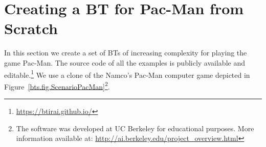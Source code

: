 %
%




\newpage	
\section{Creating a BT for Pac-Man from Scratch}
\label{sec:pacman}
In this section we create a set of BTs of increasing complexity for playing the game Pac-Man.
The source code of all the examples is publicly available and editable.\footnote{\url{https://btirai.github.io/}}
We use  a clone of the Namco's Pac-Man computer game depicted in Figure~\ref{bts.fig.ScenarioPacMan}\footnote{The software was developed at UC Berkeley for educational purposes. More information available at: \url{http://ai.berkeley.edu/project_overview.html}}.    

